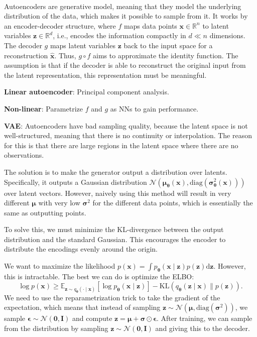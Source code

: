 \documentclass{article}
\newcommand{\E}{\mathbb{E}}
\newcommand{\R}{\mathbb{R}}
\renewcommand{\vec}[1]{\bm{#1}}
\newcommand{\mat}[1]{\bm{#1}}
\newenvironment{topic}[1]
{\textbf{\sffamily \colorbox{black}{\rlap{\textbf{\textcolor{white}{#1}}}\hspace{\linewidth}\hspace{-2\fboxsep}}} \\ \vspace{0.2cm}}
{}
\begin{document}
\begin{multicols*}{2}
\begin{topic}{Autoencoders}
        Autoencoders are generative model, meaning that they model the underlying distribution of the data,
        which makes it possible to sample from it. It works by an encoder-decoder structure, where $f$ maps
        data points $\vec{x} \in \R^n$ to latent variables $\vec{z} \in \R^d$, i.e., encodes the
        information compactly in $d \ll n$ dimensions. The decoder $g$ maps latent variables $\vec{z}$ back
        to the input space for a reconstruction $\hat{\vec{x}}$. Thus, $g \circ f$ aims to approximate the
        identity function. The assumption is that if the decoder is able to reconstruct the original input
        from the latent representation, this representation must be meaningful.

        \textbf{Linear autoencoder}: Principal component analysis.

        \textbf{Non-linear}: Parametrize $f$ and $g$ as NNs to gain performance.

        \textbf{VAE}: Autoencoders have bad sampling quality, because the latent space is not
        well-structured, meaning that there is no continuity or interpolation. The reason for this is
        that there are large regions in the latent space where there are no observations.

        The solution is to make the generator output a distribution over latents. Specifically, it outputs
        a Gaussian distribution $\mathcal{N}(\vec{\mu}_{\vec{\theta}}(\vec{x}),
            \mathrm{diag}(\vec{\sigma}_{\vec{\theta}}^2(\vec{x})))$ over latent vectors. However, naively using
        this method will result in very different $\vec{\mu}$ with very low $\vec{\sigma}^2$ for the
        different data points, which is essentially the same as outputting points.

        To solve this, we must minimize the KL-divergence between the output distribution and the standard
        Gaussian. This encourages the encoder to distribute the encodings evenly around the origin.

        We want to maximize the likelihood $p(\vec{x}) = \int p_{\vec{\theta}}(\vec{x} \mid \vec{z})
            p(\vec{z}) \mathrm{d}\vec{z}$. However, this is intractable. The best we can do is optimize the
        ELBO: \[
            \log p(\vec{x}) \geq \E_{\vec{z} \sim q_{\vec{\theta}}(\cdot \mid \vec{x})} [\log p_{\vec{\theta}}(\vec{x} \mid \vec{z})] - \mathrm{KL}(q_{\vec{\theta}}(\vec{z} \mid \vec{x}) \lVert p(\vec{z})).
        \]
        We need to use the reparametrization trick to take the gradient of the expectation, which means
        that instead of sampling $\vec{z} \sim \mathcal{N}(\vec{\mu}, \mathrm{diag}(\vec{\sigma}^2))$, we
        sample $\vec{\epsilon} \sim \mathcal{N}(\vec{0}, \mat{I})$ and compute $\vec{z} = \vec{\mu} +
            \vec{\sigma} \odot \vec{\epsilon}$. After training, we can sample from the distribution by sampling
        $\vec{z} \sim \mathcal{N}(\vec{0}, \mat{I})$ and giving this to the decoder.


\end{topic}
\end{multicols*}
\end{document}
